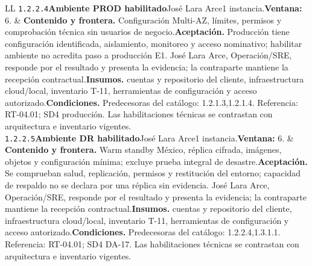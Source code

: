 \begin{longtable}{L{\tabcolsep\relax}L{\tabcolsep\relax}}
\texttt{1.\allowbreak{}2.\allowbreak{}2.\allowbreak{}4}\newline{}\textbf{Ambiente PROD habilitado}\newline{}José Lara Arce\newline{}1 instancia.\newline{}\textbf{Ventana:} 6. & \textbf{Contenido y frontera.} Configuración Multi-AZ, límites, permisos y comprobación técnica sin usuarios de negocio.\newline{}\textbf{Aceptación.} Producción tiene configuración identificada, aislamiento, monitoreo y acceso nominativo; habilitar ambiente no acredita paso a producción E1. José Lara Arce, Operación/SRE, responde por el resultado y presenta la evidencia; la contraparte mantiene la recepción contractual.\newline{}\textbf{Insumos.} cuentas y repositorio del cliente, infraestructura cloud/local, inventario T-11, herramientas de configuración y acceso autorizado.\newline{}\textbf{Condiciones.} Predecesoras del catálogo: 1.2.1.3,1.2.1.4. Referencia: RT-04.01; SD4 producción. Las habilitaciones técnicas se contrastan con arquitectura e inventario vigentes.\\\hline
\texttt{1.\allowbreak{}2.\allowbreak{}2.\allowbreak{}5}\newline{}\textbf{Ambiente DR habilitado}\newline{}José Lara Arce\newline{}1 instancia.\newline{}\textbf{Ventana:} 6. & \textbf{Contenido y frontera.} Warm standby México, réplica cifrada, imágenes, objetos y configuración mínima; excluye prueba integral de desastre.\newline{}\textbf{Aceptación.} Se comprueban salud, replicación, permisos y restitución del entorno; capacidad de respaldo no se declara por una réplica sin evidencia. José Lara Arce, Operación/SRE, responde por el resultado y presenta la evidencia; la contraparte mantiene la recepción contractual.\newline{}\textbf{Insumos.} cuentas y repositorio del cliente, infraestructura cloud/local, inventario T-11, herramientas de configuración y acceso autorizado.\newline{}\textbf{Condiciones.} Predecesoras del catálogo: 1.2.2.4,1.3.1.1. Referencia: RT-04.01; SD4 DA-17. Las habilitaciones técnicas se contrastan con arquitectura e inventario vigentes.\\\hline

\end{longtable}

